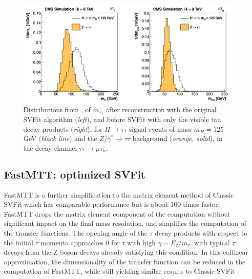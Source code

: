 \begin{figure}[ht]
    \centering
    \includegraphics[width=15cm]{figures/ch-5-object-reconstruction-and-corrections-applied/original_SVFit_resolution_2014_SVFit_Bianchini.png}
    \caption[Distributions of $m_{\tau\tau}$ reconstructed by the classic SVFit algorithm, and masses of visible tau decay products (before SVFit).]{Distributions from \cite{2014_SVFit_Bianchini}, of $m_{\tau\tau}$ after reconstruction with the original SVFit algorithm (\textit{left}), and before SVFit with only the visible tau decay products (\textit{right}), for $H \rightarrow \tau\tau$ signal events of mass $m_H = 125$ GeV (\textit{black line}) and the $Z/\gamma^* \rightarrow \tau\tau$ background (\textit{orange, solid}), in the decay channel $\tau\tau \rightarrow \mu\tau_{h}$.} 
    \label{fig:classic_svfit_resolution}
\end{figure}


\subsection{FastMTT: optimized SVFit}
FastMTT \cite{CMS-AN-19-032-FastMTT} is a further simplification to the matrix element method of Classic SVFit which has comparable performance but is about 100 times faster. FastMTT drops the matrix element component of the computation without significant impact on the final mass resolution, and simplifies the computation of the transfer functions. The opening angle of the $\tau$ decay products with respect to the initial $\tau$ momenta approaches 0 for $\tau$ with high $\gamma = E_{\tau}/m_{\tau}$, with typical $\tau$ decays from the Z boson decays already satisfying this condition. In this collinear approximation, the dimensionality of the transfer function can be reduced in the computation of FastMTT, while still yielding similar results to Classic SVFit \cite{CMS-AN-19-032-FastMTT}. 

